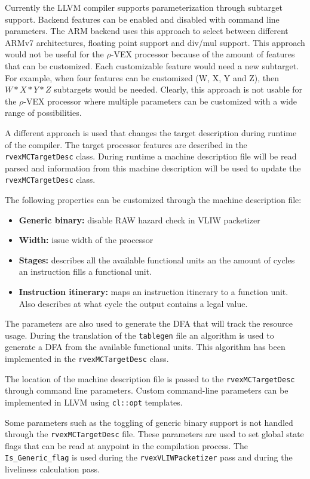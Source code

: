 Currently the LLVM compiler supports parameterization through subtarget support. Backend features can be enabled and disabled with command line parameters. The ARM backend uses this approach to select between different ARMv7 architectures, floating point support and div/mul support. This approach would not be useful for the $\rho$-VEX processor because of the amount of features that can be customized. Each customizable feature would need a new subtarget. For example, when four features can be customized (W, X, Y and Z), then $W*X*Y*Z$ subtargets would be needed. Clearly, this approach is not usable for the $\rho$-VEX processor where multiple parameters can be customized with a wide range of possibilities.

A different approach is used that changes the target description during runtime of the compiler. The target processor features are described in the \texttt{rvexMCTargetDesc} class. During runtime a machine description file will be read parsed and information from this machine description will be used to update the \texttt{rvexMCTargetDesc} class. 

The following properties can be customized through the machine description file:

\begin{itemize}
  \item \textbf{Generic binary:} disable RAW hazard check in VLIW packetizer
  \item \textbf{Width:} issue width of the processor
  \item \textbf{Stages:} describes all the available functional units an the amount of cycles an instruction fills a functional unit.
  \item \textbf{Instruction itinerary:} maps an instruction itinerary to a function unit. Also describes at what cycle the output contains a legal value.
\end{itemize}

The parameters are also used to generate the DFA that will track the resource usage. During the translation of the \texttt{tablegen} file an algorithm is used to generate a DFA from the available functional units. This algorithm has been implemented in the \texttt{rvexMCTargetDesc} class.

The location of the machine description file is passed to the \texttt{rvexMCTargetDesc} through command line parameters. Custom command-line parameters can be implemented in LLVM using \texttt{cl::opt} templates.

Some parameters such as the toggling of generic binary support is not handled through the \texttt{rvexMCTargetDesc} file. These parameters are used to set global state flags that can be read at anypoint in the compilation process. The \texttt{Is\_Generic\_flag} is used during the \texttt{rvexVLIWPacketizer} pass and during the liveliness calculation pass.

